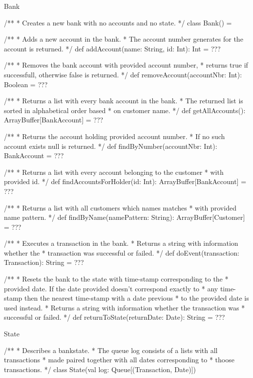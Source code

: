 \begin{ScalaSpec}{Bank}

/**
 * Creates a new bank with no accounts and no state. 
 */
class Bank() = {

  /**
   * Adds a new account in the bank.
   * The account number generates for the account is returned.
   */
  def addAccount(name: String, id: Int): Int = ???

 /**
   * Removes the bank account with provided account number,
   * returns true if successfull, otherwise false is returned.
   */
  def removeAccount(accountNbr: Int): Boolean = ???

 /**
   * Returns a list with every bank account in the bank.
   * The returned list is sorted in alphabetical order based
   * on customer name.
   */
  def getAllAccounts(): ArrayBuffer[BankAccount] = ???

  /**
   * Returns the account holding provided account number.
   * If no such account exists null is returned.
   */
  def findByNumber(accountNbr: Int): BankAccount = ???

/**
   * Returns a list with every account belonging to the customer
   * with provided id.
   */
  def findAccountsForHolder(id: Int): ArrayBuffer[BankAccount] = ???

/**
   * Returns a list with all customers which names matches
   * with provided name pattern.
   */
  def findByName(namePattern: String): ArrayBuffer[Customer] = ???

 /**
   * Executes a transaction in the bank.
   * Returns a string with information whether the
   * transaction was successful or failed.
   */
  def doEvent(transaction: Transaction): String = ???

  /**
   * Resets the bank to the state with time-stamp corresponding to the
   * provided date. If the date provided doesn't correspond exactly to 
   * any time-stamp then the nearest time-stamp with a date previous 
   *  to the provided date is used instead.
   * Returns a string with information whether the transaction was 
   * successful or failed.
   */
  def returnToState(returnDate: Date): String = ???

}
\end{ScalaSpec}


\begin{ScalaSpec}{State}

/**
 * Describes a bankstate.
 * The queue log consists of a lists with all transactions
 * made paired together with all dates corresponding to
 * thoose transactions.
 */
class State(val log: Queue[(Transaction, Date)]) 

\end{ScalaSpec}


